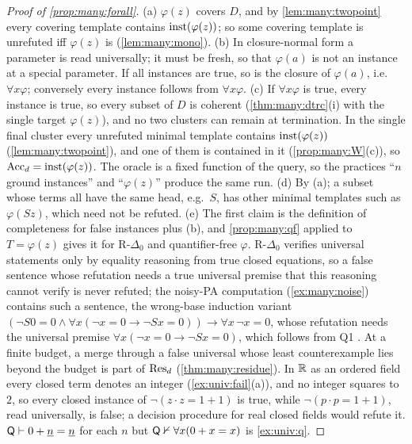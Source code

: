 \begin{proof}[Proof of \cref{prop:many:forall}]
(a) $\varphi(z)$ covers $D$, and by \cref{lem:many:twopoint} every covering template contains $\mathrm{inst}(\varphi(z))$; so some
covering template is unrefuted iff $\varphi(z)$ is (\cref{lem:many:mono}). (b) In closure-normal form a parameter is read
universally; it must be fresh, so that $\varphi(a)$ is not an instance at a special parameter. If all instances are true,
so is the closure of $\varphi(a)$, i.e.\ $\forall x\varphi$; conversely every instance follows from $\forall x\varphi$.
(c) If $\forall x\varphi$ is true, every instance is true, so every subset of $D$ is coherent (\cref{thm:many:dtrc}(i) with
the single target $\varphi(z)$), and no two clusters can remain at termination. In the single final cluster every
unrefuted minimal template contains $\mathrm{inst}(\varphi(z))$ (\cref{lem:many:twopoint}), and one of them is contained in it
(\cref{prop:many:W}(c)), so $\mathrm{Acc}_d=\mathrm{inst}(\varphi(z))$. The oracle is a fixed function of the query, so the practices
``$n$ ground instances'' and ``$\varphi(z)$'' produce the same run. (d) By (a); a subset whose terms all have the same head,
e.g.\ $S$, has other minimal templates such as $\varphi(Sz)$, which need not be refuted. (e) The first claim is the
definition of completeness for false instances plus (b), and \cref{prop:many:qf} applied to $T=\varphi(z)$ gives it for
R-$\Delta_0$ and quantifier-free $\varphi$. R-$\Delta_0$ verifies universal statements only by equality reasoning from true
closed equations, so a false sentence whose refutation needs a true universal premise that this reasoning cannot verify is
never refuted; the noisy-PA computation (\cref{ex:many:noise}) contains such a sentence, the wrong-base induction variant
$(\neg S0=0\wedge\forall x(\neg x=0\to\neg Sx=0))\to\forall x\,\neg x=0$, whose refutation needs the universal premise
$\forall x(\neg x=0\to\neg Sx=0)$, which follows from Q1 . At a finite budget, a merge through
a false universal whose least counterexample lies beyond the budget is part of $\mathrm{Res}_d$ (\cref{thm:many:residue}). In $\mathbb{R}$
as an ordered field every closed term denotes an integer (\cref{ex:univ:fail}(a)), and no integer squares to $2$, so every
closed instance of $\neg(z\cdot z=1+1)$ is true, while $\neg(p\cdot p=1+1)$, read universally, is false; a decision
procedure for real closed fields would refute it. $\mathsf{Q}\vdash0+\underline{n}=\underline{n}$ for each $n$ but $\mathsf{Q}\nvdash\forall x(0+x=x)$ is
\cref{ex:univ:q}.
\end{proof}

